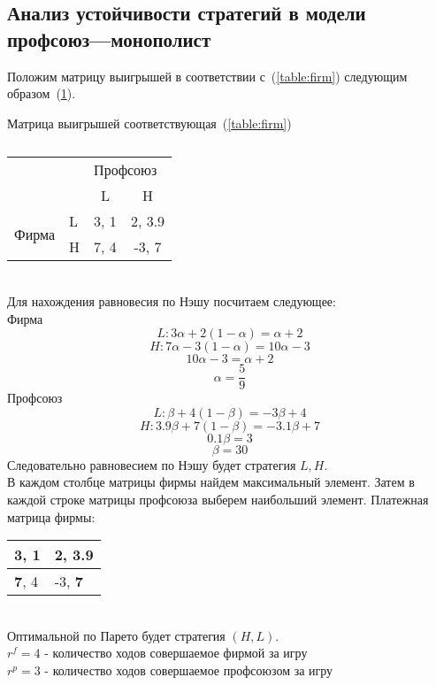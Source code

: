 \subsection{Анализ устойчивости стратегий в модели профсоюз---монополист}
Положим матрицу выигрышей в соответствии с~(\ref{table:firm}) следующим образом~(\ref{table:mono:ex}).
\begin{table}[h]
	
	\centering
	\caption{}
	\footnotesize Матрица выигрышей соответствующая~(\ref{table:firm})\\
	\normalsize
\begin{tabular}{|l|l|c|c|}
	\hline
	\multicolumn{2}{|l|}{\multirow{2}{*}{}} & \multicolumn{2}{l|}{Профсоюз} \\ \cline{3-4} 
	\multicolumn{2}{|l|}{}                  & L            & H              \\ \hline
	\multirow{2}{*}{Фирма}        & L       & 3, 1         & 2, 3.9         \\ \cline{2-4} 
	& H       & 7, 4         & -3, 7          \\ \hline
\end{tabular}
	\label{table:mono:ex}
\end{table}\\
Для нахождения равновесия по Нэшу посчитаем следующее: \\
Фирма
	$$ L:  3\alpha + 2(1-\alpha)=\alpha + 2$$
	$$ H: 7\alpha - 3(1-\alpha)=10\alpha - 3$$
	$$10\alpha - 3 = \alpha+2 $$
	$$\alpha = \frac{5}{9} $$
Профсоюз	
	 $$L: \beta + 4(1-\beta)=-3\beta + 4$$
	 $$H: 3.9\beta + 7(1-\beta)=-3.1\beta +7$$
	$$0.1\beta  = 3 $$
	$$\beta = 30 $$
Следовательно равновесием по Нэшу будет стратегия $L,H$.\\

В каждом столбце матрицы фирмы найдем максимальный элемент. 
Затем в каждой строке матрицы профсоюза выберем наибольший элемент.
Платежная матрица фирмы:\\
\begin{table}[h]
	\centering
	\begin{tabular}{|l|l|}
		\hline
		3, 1 & \textbf{2, 3.9}  \\ \hline
		\textbf{7}, 4 & -3, \textbf{7} \\ \hline
	\end{tabular}
\end{table}\\
Оптимальной по Парето будет стратегия $(H,L)$.\\
$r^f= 4 $ - количество ходов совершаемое фирмой за игру\\
$r^p= 3 $ - количество ходов совершаемое профсоюзом за игру\\ 

